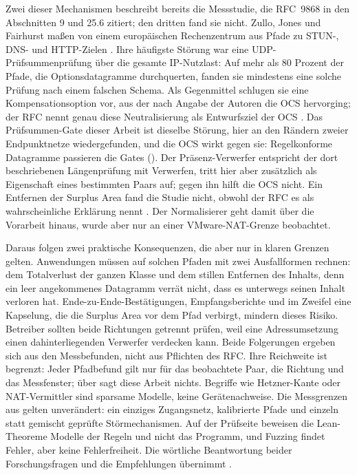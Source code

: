 Zwei dieser Mechanismen beschreibt bereits die Messstudie, die RFC~9868 in den Abschnitten 9 und 25.6 zitiert; den
dritten fand sie nicht. Zullo, Jones und Fairhurst maßen von einem europäischen Rechenzentrum aus Pfade zu STUN-,
DNS- und HTTP-Zielen \cite{zullo2020sorrows}. Ihre häufigste Störung war eine UDP-Prüfsummenprüfung über die gesamte
IP-Nutzlast: Auf mehr als 80 Prozent der Pfade, die Optionsdatagramme durchquerten, fanden sie mindestens eine
solche Prüfung nach einem falschen Schema. Als Gegenmittel schlugen sie eine Kompensationsoption vor, aus der nach
Angabe der Autoren die OCS hervorging; der RFC nennt genau diese Neutralisierung als Entwurfsziel der OCS
\cite[Sec.~9]{rfc9868}. Das Prüfsummen-Gate dieser Arbeit ist dieselbe Störung, hier an den Rändern zweier
Endpunktnetze wiedergefunden, und die OCS wirkt gegen sie: Regelkonforme Datagramme passieren die Gates
(). Der Präsenz-Verwerfer entspricht der dort beschriebenen Längenprüfung mit Verwerfen,
tritt hier aber zusätzlich als Eigenschaft eines bestimmten Paars auf; gegen ihn hilft die OCS nicht. Ein Entfernen
der Surplus Area fand die Studie nicht, obwohl der RFC es als wahrscheinliche Erklärung nennt
\cite[Sec.~25.6]{rfc9868}. Der Normalisierer geht damit über die Vorarbeit hinaus, wurde aber nur an einer
VMware-NAT-Grenze beobachtet.

Daraus folgen zwei praktische Konsequenzen, die aber nur in klaren Grenzen gelten. Anwendungen müssen auf solchen
Pfaden mit zwei Ausfallformen rechnen: dem Totalverlust der ganzen Klasse und dem stillen Entfernen des Inhalts,
denn ein leer angekommenes Datagramm verrät nicht, dass es unterwegs seinen Inhalt verloren hat.
Ende-zu-Ende-Bestätigungen, Empfangsberichte und im Zweifel eine Kapselung, die die Surplus Area vor dem Pfad
verbirgt, mindern dieses Risiko. Betreiber sollten beide Richtungen getrennt prüfen, weil eine Adressumsetzung einen
dahinterliegenden Verwerfer verdecken kann. Beide Folgerungen ergeben sich aus den Messbefunden, nicht aus Pflichten
des RFC. Ihre Reichweite ist begrenzt: Jeder Pfadbefund gilt nur für das beobachtete Paar, die Richtung und das
Messfenster; über  sagt diese Arbeit nichts. Begriffe wie Hetzner-Kante oder NAT-Vermittler sind
sparsame Modelle, keine Gerätenachweise. Die Messgrenzen aus  gelten unverändert: ein
einziges Zugangsnetz, kalibrierte Pfade und einzeln statt gemischt geprüfte Störmechanismen. Auf der Prüfseite
beweisen die Lean-Theoreme Modelle der Regeln und nicht das Programm, und Fuzzing findet Fehler, aber keine
Fehlerfreiheit. Die wörtliche Beantwortung beider Forschungsfragen und die Empfehlungen übernimmt
.

